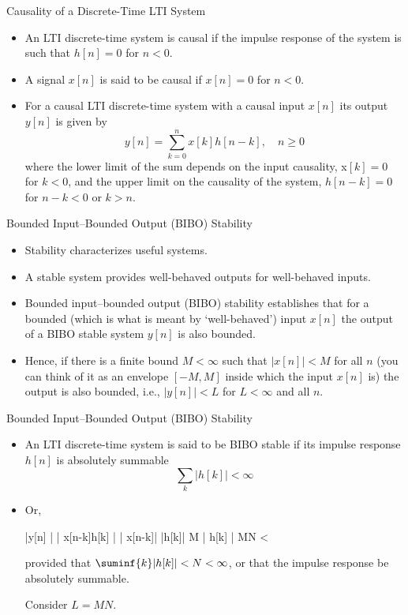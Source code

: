\documentclass[aspectratio=169,xcolor=dvipsnames,svgnames,x11names,fleqn]{beamer}
\begin{document}
\begin{frame}{Causality of a Discrete-Time LTI System}
    \begin{itemize}
    \item An LTI discrete-time system is causal if the impulse response of the system is such that $h[n] = 0$ for $n < 0$.
    \item A signal $x[n]$ is said to be causal if $x[n] = 0$ for $n < 0$.
    \item For a causal LTI discrete-time system with a causal input $x[n]$ its output $y[n]$ is given by 
    $$ 
    y[n] = \sum_{k = 0}^n  x[k]h[n-k], \quad n \geq 0
    $$
    where the lower limit of the sum depends on the input causality, x$[k] = 0$ for $k < 0$, and the upper limit on the causality
of the system, $h[n - k] = 0$ for $n - k < 0$ or $k>n$.

\end{itemize}

\end{frame}

\begin{frame}{Bounded Input–Bounded Output (BIBO) Stability}
    \begin{itemize}
        \item Stability characterizes useful systems. 
        \item A stable system provides well-behaved outputs for well-behaved
inputs. 
\item  Bounded input–bounded output (BIBO) stability establishes that for a bounded (which is what is meant by `well-behaved') input $x[n]$ the output of a BIBO stable system $y[n]$ is also bounded.
\item Hence, if there is a finite bound $M < \infty$ such that $|x[n]| < M$ for all $n$ (you can think of it as an envelope $[-M,M]$ inside which the input $x[n]$ is) the output is also bounded, i.e., $|y[n]| < L$ for $L < \infty$ and all $n$.
    \end{itemize}
\end{frame}

\begin{frame}{Bounded Input–Bounded Output (BIBO) Stability}

    \begin{itemize}
        \item An LTI discrete-time system is said to be BIBO stable if its impulse response $h[n]$ is absolutely summable
$$
\sum_{k}| h[k]| < \infty 
$$
\item Or, 
\begin{multiequation}
    |y[n] | \leq \bigg |     x[n-k]h[k]    \bigg|  \leq | x[n-k]| |h[k]| \leq M  | h[k] | \leq MN < \infty
\end{multiequation}

provided that $\suminf{k}  |h[k]| <N< \infty$, or that the impulse response be absolutely summable.

Consider $L = MN$.
        
    \end{itemize}
\end{frame}
\end{document}
